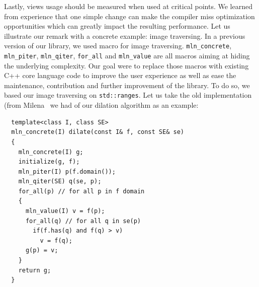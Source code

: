 Lastly, views usage should be measured when used at critical points. We learned from experience that one simple change
can make the compiler miss optimization opportunities which can greatly impact the resulting performance. Let us
illustrate our remark with a concrete example: image traversing. In a previous version of our library, we used macro for
image traversing. \texttt{mln\_concrete}, \texttt{mln\_piter}, \texttt{mln\_qiter}, \texttt{for\_all} and
\texttt{mln\_value} are all macros aiming at hiding the underlying complexity. Our goal were to replace those macros
with existing C++ core language code to improve the user experience as well as ease the maintenance, contribution and
further improvement of the library. To do so, we based our image traversing on \texttt{std::ranges}. Let us take the old
implementation (from Milena~\parencite{levillain.2010.icip} we had of our dilation algorithm as an example:
\begin{verbatim}
  template<class I, class SE>
  mln_concrete(I) dilate(const I& f, const SE& se)
  {
    mln_concrete(I) g;
    initialize(g, f);
    mln_piter(I) p(f.domain());
    mln_qiter(SE) q(se, p);
    for_all(p) // for all p in f domain
    {
      mln_value(I) v = f(p);
      for_all(q) // for all q in se(p)
        if(f.has(q) and f(q) > v)
          v = f(q);
      g(p) = v;
    }
    return g;
  }
\end{verbatim}

